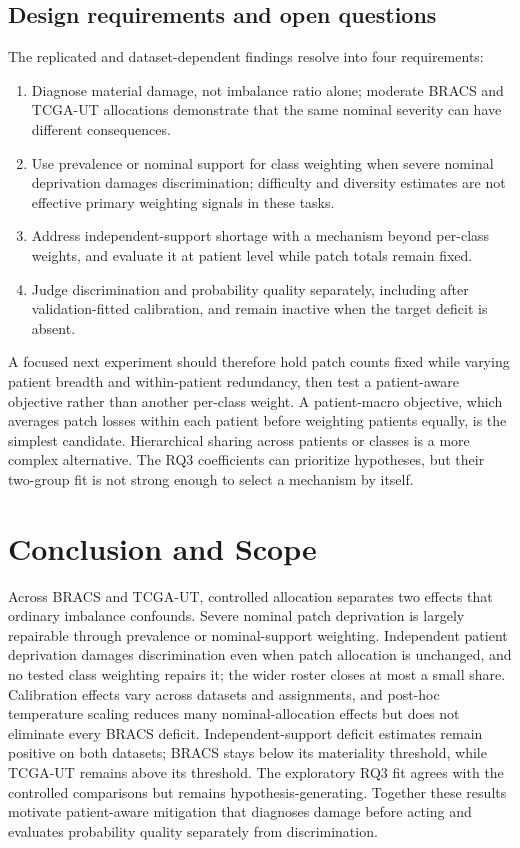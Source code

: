 \documentclass[11pt]{article}
\begin{document}
\subsection{Design requirements and open questions}
\label{sec:discussion-requirements}
The replicated and dataset-dependent findings resolve into four requirements:
\begin{enumerate}
  \item Diagnose material damage, not imbalance ratio alone; moderate BRACS and TCGA-UT allocations demonstrate that the same nominal severity can have different consequences.
  \item Use prevalence or nominal support for class weighting when severe nominal deprivation damages discrimination; difficulty and diversity estimates are not effective primary weighting signals in these tasks.
  \item Address independent-support shortage with a mechanism beyond per-class weights, and evaluate it at patient level while patch totals remain fixed.
  \item Judge discrimination and probability quality separately, including after validation-fitted calibration, and remain inactive when the target deficit is absent.
\end{enumerate}
\noindent A focused next experiment should therefore hold patch counts fixed while varying patient breadth and within-patient redundancy, then test a patient-aware objective rather than another per-class weight. A patient-macro objective, which averages patch losses within each patient before weighting patients equally, is the simplest candidate. Hierarchical sharing across patients or classes is a more complex alternative. The RQ3 coefficients can prioritize hypotheses, but their two-group fit is not strong enough to select a mechanism by itself.

\section{Conclusion and Scope}
\label{sec:limits}
Across BRACS and TCGA-UT, controlled allocation separates two effects that ordinary imbalance confounds. Severe nominal patch deprivation is largely repairable through prevalence or nominal-support weighting. Independent patient deprivation damages discrimination even when patch allocation is unchanged, and no tested class weighting repairs it; the wider roster closes at most a small share. Calibration effects vary across datasets and assignments, and post-hoc temperature scaling reduces many nominal-allocation effects but does not eliminate every BRACS deficit. Independent-support deficit estimates remain positive on both datasets; BRACS stays below its materiality threshold, while TCGA-UT remains above its threshold. The exploratory RQ3 fit agrees with the controlled comparisons but remains hypothesis-generating. Together these results motivate patient-aware mitigation that diagnoses damage before acting and evaluates probability quality separately from discrimination.
\end{document}
